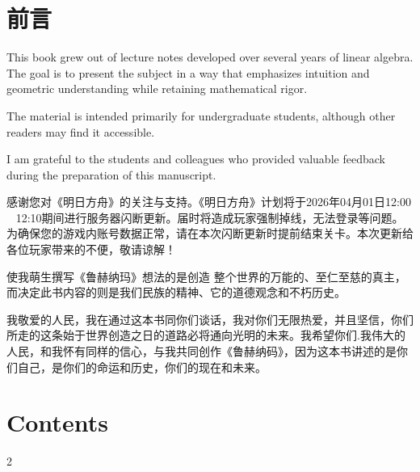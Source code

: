 \clearpage
\restoregeometry
\pagestyle{fancy}


\chapter*{前言}

This book grew out of lecture notes developed over several years of linear algebra. The goal is to present the subject in a way that emphasizes intuition and geometric understanding while retaining mathematical rigor.  

The material is intended primarily for undergraduate students, although other readers may find it accessible.  

I am grateful to the students and colleagues who provided valuable feedback during the preparation of this manuscript.

感谢您对《明日方舟》的关注与支持。《明日方舟》计划将于2026年04月01日12:00 ~ 12:10期间进行服务器闪断更新。届时将造成玩家强制掉线，无法登录等问题。为确保您的游戏内账号数据正常，请在本次闪断更新时提前结束关卡。本次更新给各位玩家带来的不便，敬请谅解！

{\KalWrite 使我萌生撰写《鲁赫纳玛》想法的是创造 整个世界的万能的、至仁至慈的真主，而决定此书内容的则是我们民族的精神、它的道德观念和不朽历史。

我敬爱的人民，我在通过这本书同你们谈话，我对你们无限热爱，并且坚信，你们所走的这条始于世界创造之日的道路必将通向光明的未来。我希望你们.我伟大的人民，和我怀有同样的信心，与我共同创作《鲁赫纳码》，因为这本书讲述的是你们自己，是你们的命运和历史，你们的现在和未来。}


\pagestyle{empty}


\chapter*{Contents}
\begin{multicols}{2}
    \makeatletter
    \makeatother
\end{multicols}
\clearpage
\restoregeometry
\pagestyle{fancy}
